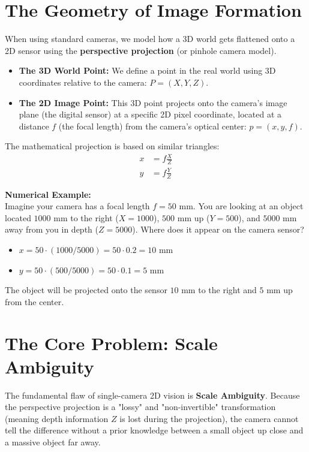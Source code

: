 \documentclass{report}
\begin{document}
\section{The Geometry of Image Formation}
When using standard cameras, we model how a 3D world gets flattened onto a 2D sensor using the \textbf{perspective projection} (or pinhole camera model).

\begin{itemize}
    \item \textbf{The 3D World Point:} We define a point in the real world using 3D coordinates relative to the camera: $P = (X, Y, Z)$.
    \item \textbf{The 2D Image Point:} This 3D point projects onto the camera's image plane (the digital sensor) at a specific 2D pixel coordinate, located at a distance $f$ (the focal length) from the camera's optical center: $p = (x, y, f)$.
\end{itemize}

The mathematical projection is based on similar triangles:
\begin{align*}
    x &= f \frac{X}{Z} \\
    y &= f \frac{Y}{Z}
\end{align*}

\textbf{Numerical Example:} \\
Imagine your camera has a focal length $f = 50\text{ mm}$. You are looking at an object located $1000\text{ mm}$ to the right
($X = 1000$), $500\text{ mm}$ up ($Y = 500$), and $5000\text{ mm}$ away from you in depth ($Z = 5000$). Where does it appear on
the camera sensor?
\begin{itemize}
    \item $x = 50 \cdot (1000 / 5000) = 50 \cdot 0.2 = 10\text{ mm}$
    \item $y = 50 \cdot (500 / 5000) = 50 \cdot 0.1 = 5\text{ mm}$
\end{itemize}
The object will be projected onto the sensor $10\text{ mm}$ to the right and $5\text{ mm}$ up from the center.

\section{The Core Problem: Scale Ambiguity}
The fundamental flaw of single-camera 2D vision is \textbf{Scale Ambiguity}. Because the perspective projection is a "lossy" and
"non-invertible" transformation (meaning depth information $Z$ is lost during the projection), the camera cannot tell the difference
without a prior knowledge between a small object up close and a massive object far away.
\end{document}
